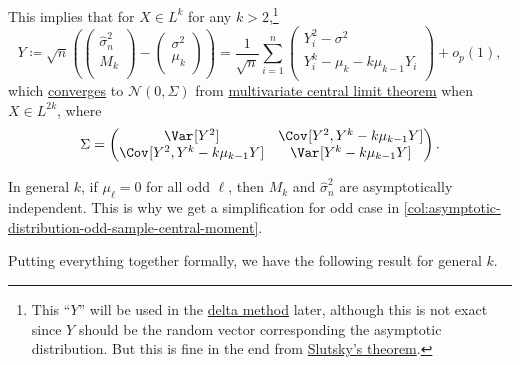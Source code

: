 This implies that for \(X \in L^{k}\) for any \(k > 2\),\footnote{This ``\(Y\)'' will be used in the \hyperref[thm:delta-method]{delta method} later, although this is not exact since \(Y\) should be the random vector corresponding the asymptotic distribution. But this is fine in the end from \hyperref[thm:Slutsky]{Slutsky's theorem}.}
\begin{equation}\label{eq:joint-representation-sample-variance-central-moment}
	Y \coloneqq \sqrt{n} \left( \begin{pmatrix}
			\hat{\sigma} _n^2 \\
			M_k               \\
		\end{pmatrix} - \begin{pmatrix}
			\sigma ^2 \\
			\mu _k    \\
		\end{pmatrix} \right)
	= \frac{1}{\sqrt{n} } \sum_{i=1}^{n}  \begin{pmatrix}
		Y_i^2 - \sigma ^2                 \\
		Y_i^k - \mu _k - k \mu _{k-1} Y_i \\
	\end{pmatrix} + o_p(1),
\end{equation}
which \hyperref[def:converge-in-distribution]{converges} to \(\mathcal{N} (0, \Sigma )\) from \hyperref[thm:multivariate-CLT]{multivariate central limit theorem} when \(X \in L^{2k}\), where
\[
	\Sigma = \begin{pmatrix}
		\Var_{}[Y^2]                        & \Cov_{}[Y^2 , Y^k - k \mu _{k-1} Y] \\
		\Cov_{}[Y^2 , Y^k - k \mu _{k-1} Y] & \Var_{}[Y^k - k \mu _{k-1} Y]       \\
	\end{pmatrix}.
\]

\begin{remark}
	In general \(k\), if \(\mu _{\ell } = 0\) for all odd \(\ell \), then \(M_k\) and \(\hat{\sigma} _n^2\) are asymptotically independent. This is why we get a simplification for odd case in \autoref{col:asymptotic-distribution-odd-sample-central-moment}.
\end{remark}

Putting everything together formally, we have the following result for general \(k\).

